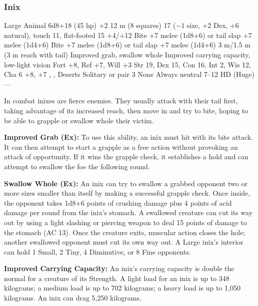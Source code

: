 \subsubsection{Inix}
\begin{MonsterStats}
{Large Animal}
{6d8+18 (45 hp)}
{+2}
{12 m (8 squares)}
{17 ($-1$ size, +2 Dex, +6 natural), touch 11, flat-footed 15}
{+4/+12}
{Bite +7 melee (1d8+6) or tail slap +7 melee (1d4+6)}
{Bite +7 melee (1d8+6) or tail slap +7 melee (1d4+6)}
{3 m/1.5 m (3 m reach with tail)}
{Improved grab, swallow whole}
{Improved carrying capacity, low-light vision}
{Fort +8, Ref +7, Will +3}
{Str 19, Dex 15, Con 16, Int 2, Wis 12, Cha 6}
{ +8,  +7}
{, , }
{Deserts}
{Solitary or pair}
{3}
{None}
{Always neutral}
{7--12 HD (Huge)}
{---}
\end{MonsterStats}


In combat inixes are fierce enemies. They usually attack with their tail first, taking advantage of its increased reach, then move in and try to bite, hoping to be able to grapple or swallow whole their victim.

\textbf{Improved Grab (Ex):} To use this ability, an inix must hit with its bite attack. It can then attempt to start a grapple as a free action without provoking an attack of opportunity. If it wins the grapple check, it establishes a hold and can attempt to swallow the foe the following round.

\textbf{Swallow Whole (Ex):} An inix can try to swallow a grabbed opponent two or more sizes smaller than itself by making a successful grapple check. Once inside, the opponent takes 1d8+6 points of crushing damage plus 4 points of acid damage per round from the inix's stomach. A swallowed creature can cut its way out by using a light slashing or piercing weapon to deal 15 points of damage to the stomach (AC 13). Once the creature exits, muscular action closes the hole; another swallowed opponent must cut its own way out. A Large inix's interior can hold 1 Small, 2 Tiny, 4 Diminutive, or 8 Fine opponents.

\textbf{Improved Carrying Capacity:} An inix's carrying capacity is double the normal for a creature of its Strength. A light load for an inix is up to 348 kilograms; a medium load is up to 702 kilograms; a heavy load is up to 1,050 kilograms. An inix can drag 5,250 kilograms.
